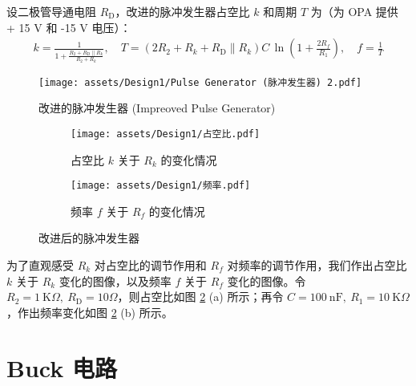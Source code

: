\documentclass[UTF8]{article}
\def\kO{\ \mathrm{K}\Omega}
\def\KO{\ \mathrm{K}\Omega}
\def\nF{\ \mathrm{nF}}
\def\kO{\ \mathrm{K}\Omega}
\def\KO{\ \mathrm{K}\Omega}
\theoremstyle{MyLineTheoremStyle} %
\theoremstyle{MyBlockTheoremStyle} %
\theoremstyle{MySubsubsectionStyle} %
\begin{document}
设二极管导通电阻 $R_\text{D}$，改进的脉冲发生器占空比 $k$ 和周期 $T$ 为（为 OPA 提供 + 15 V 和 -15 V 电压）：
\begin{gather}
k = \frac{1}{1 + \frac{R_2 +  R_\text{D} \parallel R_k}{R_2 + R_k}},\quad 
T = \left( 2R_2 + R_k + R_\text{D} \parallel R_k \right)C \, \ln \left(1 + \frac{2 R_f}{R_1}\right),\quad f = \frac{1}{T}
\end{gather}
\begin{figure}[H]\centering
    \texttt{[image: assets/Design1/Pulse Generator (脉冲发生器) 2.pdf]}
    \caption{改进的脉冲发生器 (Impreoved Pulse Generator)}
    \label{fig:Impreoved Pulse Generator}
\end{figure}

\begin{figure}[H]\centering
\begin{subfigure}[b]{0.5\columnwidth}\centering
    \texttt{[image: assets/Design1/占空比.pdf]}
    \caption{占空比 $k$ 关于 $R_k$ 的变化情况}
\end{subfigure}\hfill
\begin{subfigure}[b]{0.5\columnwidth}\centering
    \texttt{[image: assets/Design1/频率.pdf]}
    \caption{频率 $f$ 关于 $R_f$ 的变化情况}
\end{subfigure}
\caption{改进后的脉冲发生器}
\label{fig:Impreoved Pulse Generator}
\end{figure}

为了直观感受 $R_k$ 对占空比的调节作用和 $R_f$ 对频率的调节作用，我们作出占空比 $k$ 关于 $R_k$ 变化的图像，以及频率 $f$ 关于 $R_f$ 变化的图像。令 $R_2 = 1\kO,\ R_\text{D} = 10 \Omega$，则占空比如图 \ref{fig:Impreoved Pulse Generator} (a) 所示；再令 $C = 100 \nF,\ R_1 = 10 \KO$，作出频率变化如图 \ref{fig:Impreoved Pulse Generator} (b) 所示。

\section{Buck 电路}
\end{document}
